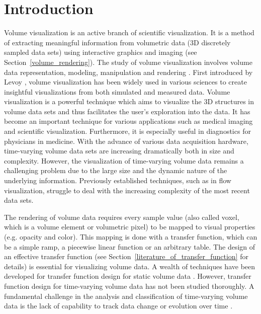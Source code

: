 \chapter{Introduction \label{section_introduction}}

\cite{moreland_survey_2013}
\cite{beyer_state---art_2015}

Volume visualization is an active branch of scientific visualization. It is a method of extracting meaningful information from volumetric data (3D discretely sampled data sets) using interactive graphics and imaging (see Section~\ref{volume_rendering}). The study of volume visualization involves volume data representation, modeling, manipulation and rendering \cite{kaufman_volume_1997}.
First introduced by Levoy \cite{levoy_display_1988}, volume visualization has been widely used in various sciences to create insightful visualizations from both simulated and measured data.
Volume visualization is a powerful technique which aims to visualize the 3D structures in volume data sets and thus facilitates the user's exploration into the data. It has become an important technique for various applications such as medical imaging and scientific visualization. Furthermore, it is especially useful in diagnostics for physicians in medicine.
With the advance of various data acquisition hardware,
time-varying volume data sets are increasing dramatically both in size and complexity. However, the visualization of time-varying volume data remains a challenging problem due to the large size and the dynamic nature of the underlying information.
Previously established techniques, such as in flow visualization, struggle to deal with the increasing complexity of the most recent data sets.

The rendering of volume data requires every sample value (also called voxel, which is a volume element or volumetric pixel) to be mapped to visual properties (e.g. opacity and color). This mapping is done with a transfer function, which can be a simple ramp, a piecewise linear function or an arbitrary table.
The design of an effective transfer function (see Section~\ref{literature_of_transfer_function} for details) is essential for visualizing volume data. A wealth of techniques have been developed for transfer function design for static volume data \cite{kindlmann_semi-automatic_1998} \cite{pfister_transfer_2001} \cite{kniss_multidimensional_2002} \cite{bernardon_transfer-function_2008} \cite{arens_survey_2010}. However, transfer function design for time-varying volume data has not been studied thoroughly. %
A fundamental challenge in the analysis and classification of time-varying volume data is the lack of capability to %
track data change or evolution over time \cite{gu_transgraph_2011}.


